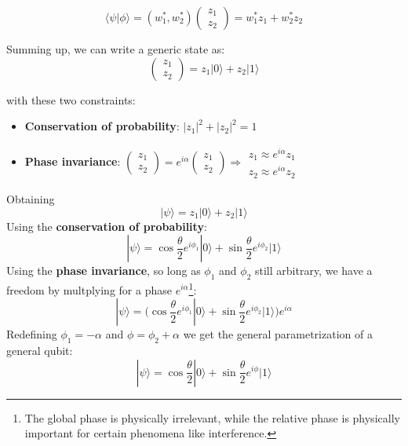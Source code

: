 \begin{equation*}
    \langle\psi|\phi\rangle=(w_1^*, w_2^*)\begin{pmatrix}z_1\\z_2\end{pmatrix}=w_1^*z_1+w_2^*z_2
\end{equation*}

\noindent Summing up, we can write a generic state as:
\begin{equation*}
    \begin{pmatrix}z_1\\z_2\end{pmatrix}=z_1|0\rangle+z_2|1\rangle
\end{equation*}

\noindent with these two constraints:
\begin{itemize}
    \item \textbf{Conservation of probability}: $|z_1|^2+|z_2|^2=1$
    \item \textbf{Phase invariance}: $\begin{pmatrix}z_1\\z_2\end{pmatrix}=e^{i\alpha}\begin{pmatrix}z_1\\z_2\end{pmatrix} \Rightarrow \begin{matrix}z_1\approx e^{i\alpha}z_1 \\z_2 \approx e^{i\alpha}z_2\end{matrix}$
\end{itemize}
\noindent Obtaining
\begin{equation*}
    |\psi\rangle =z_1|0\rangle+z_2|1\rangle
\end{equation*}
\noindent Using the \textbf{conservation of probability}:
\begin{equation*}
    |\psi\rangle =\cos\frac{\theta}{2}e^{i\phi_1}|0\rangle+\sin\frac{\theta}{2}e^{i\phi_2}|1\rangle
\end{equation*}
\noindent Using the \textbf{phase invariance}, so long as $\phi_1$ and $\phi_2$ still arbitrary, we have a freedom by multplying for a phase $e^{i\alpha}$\footnote{The global phase is physically irrelevant, while the relative phase is physically important for certain phenomena like interference.}:
\begin{equation*}
    |\psi\rangle =\bigg(\cos\frac{\theta}{2}e^{i\phi_1}|0\rangle+\sin\frac{\theta}{2}e^{i\phi_2}|1\rangle\bigg)e^{i\alpha}
\end{equation*}
\noindent Redefining $\phi_1=-\alpha$ and $\phi = \phi_2+\alpha$ we get the general parametrization of a general qubit:
\begin{equation*}
    |\psi\rangle= \cos\frac{\theta}{2}|0\rangle+\sin\frac{\theta}{2}e^{i\phi}|1\rangle
\end{equation*}

